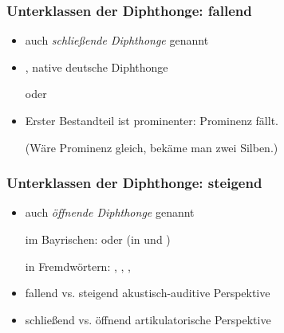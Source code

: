 \begin{frame}
\frametitle{Unterklassen der Diphthonge: fallend}
		
		\begin{itemize}
			
			\item auch \emph{schließende Diphthonge} genannt
			\item {}, native deutsche Diphthonge

			\ea {} oder 
			\z

			\item Erster Bestandteil ist prominenter: Prominenz fällt.\par
				(Wäre Prominenz gleich, bekäme man zwei Silben.)
				
			\end{itemize}
	
\end{frame}
\begin{frame}
\frametitle{Unterklassen der Diphthonge: steigend}		

		\begin{itemize}	
			\item auch \emph{öffnende Diphthonge} genannt

			\ea im Bayrischen: \textipa{[ \t{ɪa}, \t{ʊa} ]} oder  (in  und )
			\z
			
			\ea in Fremdwörtern: , , , 
			\z
			
			\item fallend vs. steigend \ras akustisch-auditive Perspektive
			\item schließend vs. öffnend \ras artikulatorische Perspektive
		\end{itemize}
		
\end{frame}


